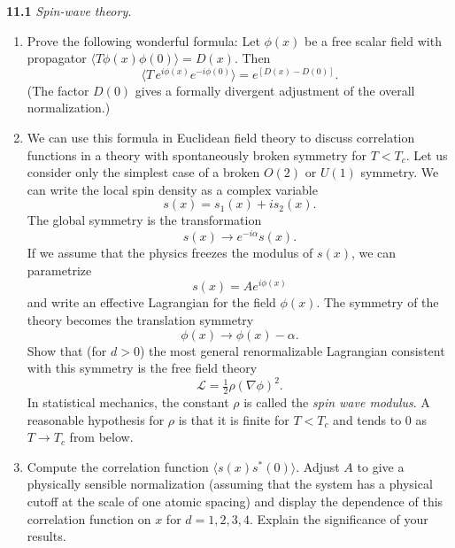 \problems

\textbf{11.1} \emph{Spin-wave theory.}
\begin{enumerate}[label=(\alph*)]
  \item Prove the following wonderful formula: Let $\phi(x)$ be a free scalar
    field with propagator $\langle T\phi(x)\phi(0)\rangle = D(x)$.  Then
    \begin{equation}
      \langle T\,e^{i\phi(x)}e^{-i\phi(0)} \rangle
      = e^{\left[ D(x) - D(0) \right]} .
    \end{equation}
    (The factor $D(0)$ gives a formally divergent adjustment of the overall
    normalization.)
  \item We can use this formula in Euclidean field theory to discuss
    correlation functions in a theory with spontaneously broken symmetry for
    $T < T_c$.  Let us consider only the simplest case of a broken $O(2)$ or
    $U(1)$ symmetry.  We can write the local spin density as a complex
    variable
    \begin{equation}
      s(x) = s_1(x) + is_2(x) .
    \end{equation}
    The global symmetry is the transformation
    \begin{equation}
      s(x) \to e^{-i\alpha}s(x) .
    \end{equation}
    If we assume that the physics freezes the modulus of $s(x)$, we can
    parametrize
    \begin{equation}
      s(x) = Ae^{i\phi(x)}
    \end{equation}
    and write an effective Lagrangian for the field $\phi(x)$.  The symmetry
    of the theory becomes the translation symmetry
    \begin{equation}
      \phi(x) \to \phi(x) - \alpha .
    \end{equation}
    Show that (for $d > 0$) the most general renormalizable Lagrangian
    consistent with this symmetry is the free field theory
    \begin{equation}
      \mathcal{L} = \tfrac{1}{2}\rho(\nabla\phi)^2 .
    \end{equation}
    In statistical mechanics, the constant $\rho$ is called the \emph{spin
    wave modulus}.  A reasonable hypothesis for $\rho$ is that it is finite
    for $T < T_c$ and tends to 0 as $T\to T_c$ from below.
  \item Compute the correlation function $\langle s(x)s^{*}(0)\rangle$.
    Adjust $A$ to give a physically sensible normalization (assuming that the
    system has a physical cutoff at the scale of one atomic spacing) and
    display the dependence of this correlation function on $x$ for
    $d = 1, 2, 3, 4$.  Explain the significance of your results.
\end{enumerate}

